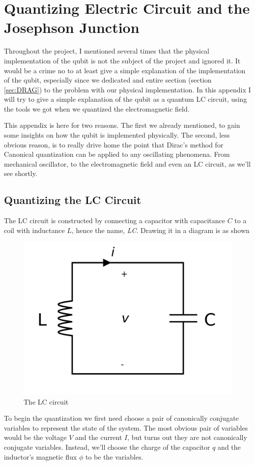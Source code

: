 \section{Quantizing Electric Circuit and the Josephson Junction} \label{appen:LC}
Throughout the project, I mentioned several times that the physical implementation of the qubit is not  the subject of the project and ignored it. It would be a crime no to at least give a simple explanation of the implementation of the qubit, especially since we dedicated and entire section  (section \ref{sec:DRAG}) to the problem with our physical implementation. In this appendix I will try to give a simple explanation of  the qubit as a quantum LC circuit, using the  tools we got when we quantized the electromagnetic field.

This appendix is here for two reasons. The first we already mentioned, to gain some insights on how the qubit is implemented physically. The second, less obvious reason, is to really drive home the point that Dirac's method for Canonical quantization can be applied to any oscillating phenomena. From mechanical oscillator, to the electromagnetic field and even an LC circuit, as we'll see shortly.

\subsection{Quantizing the LC Circuit}
The LC circuit is constructed by connecting a capacitor with capacitance $C$ to a coil with inductance $L$, hence the name, \textit{LC}. Drawing it in a diagram is as shown
\begin{figure}[H]
    \centering
    \includegraphics[width=0.4\columnwidth]{LC-circuit.png}
    \caption{The LC circuit} 
    \label{fig:LC-circuit}
\end{figure}

To begin the quantization we first need choose a pair of canonically conjugate variables to represent the state of the system. The most obvious pair of variables would be the voltage $V$ and the current $I$, but turns out they are not canonically conjugate variables. Instead, we'll choose the charge of the capacitor $q$ and the inductor's magnetic flux $\phi$ to be the variables. 

